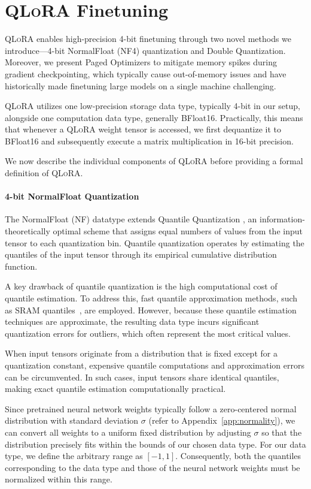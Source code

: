 \section{\textsc{QLoRA} Finetuning}

\textsc{QLoRA} enables high-precision 4-bit finetuning through two novel methods we introduce—4-bit NormalFloat (NF4) quantization and Double Quantization. Moreover, we present Paged Optimizers to mitigate memory spikes during gradient checkpointing, which typically cause out-of-memory issues and have historically made finetuning large models on a single machine challenging.

\textsc{QLoRA} utilizes one low-precision storage data type, typically 4-bit in our setup, alongside one computation data type, generally BFloat16. Practically, this means that whenever a \textsc{QLoRA} weight tensor is accessed, we first dequantize it to BFloat16 and subsequently execute a matrix multiplication in 16-bit precision.

We now describe the individual components of \textsc{QLoRA} before providing a formal definition of \textsc{QLoRA}.

\paragraph{4-bit NormalFloat Quantization} The NormalFloat (NF) datatype extends Quantile Quantization \citep{dettmers2022optimizers}, an information-theoretically optimal scheme that assigns equal numbers of values from the input tensor to each quantization bin. Quantile quantization operates by estimating the quantiles of the input tensor through its empirical cumulative distribution function.

A key drawback of quantile quantization is the high computational cost of quantile estimation. To address this, fast quantile approximation methods, such as SRAM quantiles~\citep{dettmers2022optimizers}, are employed. However, because these quantile estimation techniques are approximate, the resulting data type incurs significant quantization errors for outliers, which often represent the most critical values.

When input tensors originate from a distribution that is fixed except for a quantization constant, expensive quantile computations and approximation errors can be circumvented. In such cases, input tensors share identical quantiles, making exact quantile estimation computationally practical.

Since pretrained neural network weights typically follow a zero-centered normal distribution with standard deviation $\sigma$ (refer to Appendix~\ref{app:normality}), we can convert all weights to a uniform fixed distribution by adjusting $\sigma$ so that the distribution precisely fits within the bounds of our chosen data type. For our data type, we define the arbitrary range as $[-1, 1]$. Consequently, both the quantiles corresponding to the data type and those of the neural network weights must be normalized within this range.

